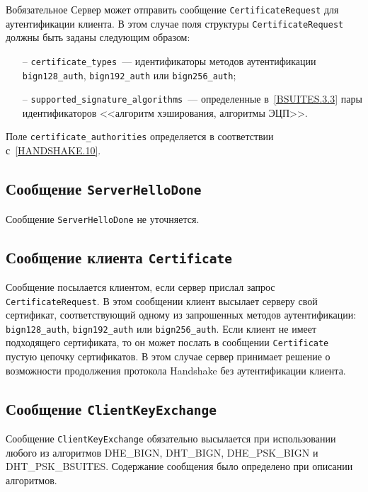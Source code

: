 \begin{appendix}{В}{обязательное}
Сервер может отправить сообщение \lstinline{CertificateRequest} для аутентификации 
клиента. В этом случае поля структуры \lstinline{CertificateRequest} должны быть 
заданы следующим образом:  

\begin{itemize}
\item[--]
\lstinline{certificate_types}~--- идентификаторы методов аутентификации 
\lstinline{bign128_auth}, \lstinline{bign192_auth} или 
\lstinline{bign256_auth}; 

\item[--]
\lstinline{supported_signature_algorithms}~--- определенные 
в~\ref{BSUITES.3.3} пары идентификаторов <<алгоритм хэширования, алгоритмы
ЭЦП>>.
\end{itemize}

Поле \lstinline{certificate_authorities} определяется в соответствии 
с~\ref{HANDSHAKE.10}. 

\subsection{Сообщение \lstinline{ServerHelloDone}}\label{BSUITES.4.6}

Сообщение \lstinline{ServerHelloDone} не уточняется. 

\subsection{Сообщение клиента \lstinline{Certificate}}\label{BSUITES.4.7}

Сообщение посылается клиентом, если сервер прислал запрос 
\lstinline{CertificateRequest}. В этом сообщении клиент высылает серверу свой 
сертификат, соответствующий одному из запрошенных методов аутентификации: 
\lstinline{bign128_auth}, \lstinline{bign192_auth} или 
\mbox{\lstinline{bign256_auth}.} Если клиент не имеет подходящего 
сертификата, то он может послать в сообщении \lstinline{Certificate} 
пустую цепочку сертификатов. В этом случае сервер принимает решение о  
возможности продолжения протокола Handshake без аутентификации клиента. 

\subsection{Сообщение \lstinline{ClientKeyExchange}}\label{BSUITES.4.8}

Сообщение \lstinline{ClientKeyExchange} обязательно высылается при 
использовании любого из алгоритмов DHE\_BIGN, DHT\_BIGN, DHE\_PSK\_BIGN и 
DHT\_PSK\_BSUITES. Содержание сообщения было определено при описании 
алгоритмов.  


\end{appendix}
